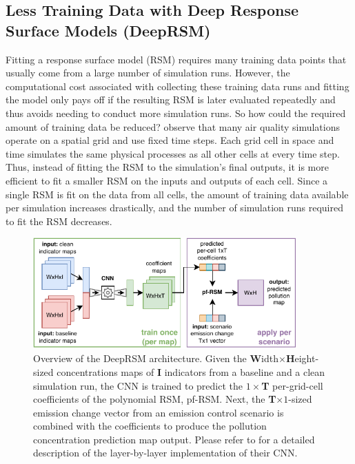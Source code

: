 \subsection{Less Training Data with Deep Response Surface Models (DeepRSM)} \label{txt:deep-rsm}

Fitting a response surface model (RSM) requires many training data points that usually come from a large number of simulation runs. However, the computational cost associated with collecting these training data runs and fitting the model only pays off if the resulting RSM is later evaluated repeatedly and thus avoids needing to conduct more simulation runs. So how could the required amount of training data be reduced? \textcite{deep-rsm-2020} observe that many air quality simulations operate on a spatial grid and use fixed time steps. Each grid cell in space and time simulates the same physical processes as all other cells at every time step. Thus, instead of fitting the RSM to the simulation's final outputs, it is more efficient to fit a smaller RSM on the inputs and outputs of each cell. Since a single RSM is fit on the data from all cells, the amount of training data available per simulation increases drastically, and the number of simulation runs required to fit the RSM decreases.

\begin{figure}[H]
    \centering
    \includegraphics[width=0.9\textwidth]{background/figures/deep-rsm.pdf}
    \caption[Overview of the DeepRSM architecture]{Overview of the DeepRSM architecture. Given the \textbf{W}idth$\times$\textbf{H}eight-sized concentrations maps of \textbf{I} indicators from a baseline and a clean simulation run, the CNN is trained to predict the $1 \times$\textbf{T} per-grid-cell coefficients of the polynomial RSM, pf-RSM. Next, the \textbf{T}$\times 1$-sized emission change vector from an emission control scenario is combined with the coefficients to produce the pollution concentration prediction map output. Please refer to \textcite{deep-rsm-2020} for a detailed description of the layer-by-layer implementation of their CNN.}
    \label{fig:deep-rsm}
\end{figure}

